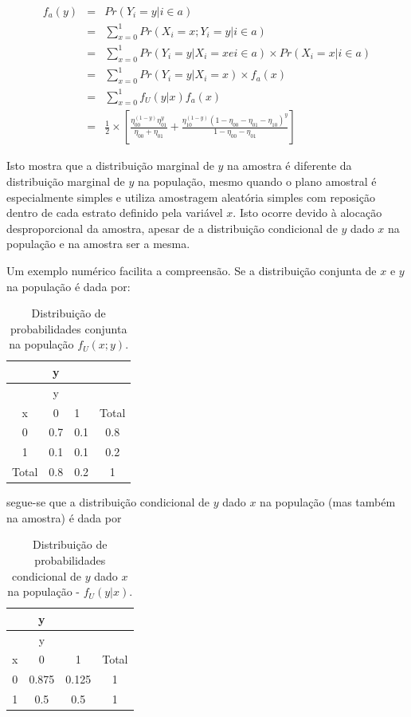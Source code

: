 \documentclass[]{book}
\theoremstyle{definition}
\theoremstyle{definition}
\theoremstyle{definition}
\theoremstyle{remark}
\begin{document}
\begin{eqnarray}
 f_a (y) &= &Pr( Y_i = y | i \in a )\\ 
&=& \sum _{x = 0} ^{1} Pr( X_i = x ; Y_i = y | i \in a) \nonumber \\ 
&=& \sum _{x = 0} ^{1} Pr( Y_i = y | X_i = x e i \in a) \times Pr( X_i = x | i \in a) \nonumber\\ 
&=& \sum _{x = 0} ^{1} Pr( Y_i = y | X_i = x) \times f_a (x) \nonumber \\ 
&=& \sum _{x = 0} ^{1} f_U ( y | x) f_a (x) \nonumber \\ 
&=& \frac{1}{2} \times \left[ \frac{\eta_{00}^{(1-y)} \eta_{01}^y} {\eta_{00}+\eta_{01}}+ \frac{\eta_{10}^{(1-y)} (1 - \eta_{00} - \eta_{01} - \eta_{10})^y} {1 - \eta_{00} - \eta_{01}} \right]\nonumber
\end{eqnarray}

Isto mostra que a distribuição marginal de \(y\) na amostra é diferente
da distribuição marginal de \(y\) na população, mesmo quando o plano
amostral é especialmente simples e utiliza amostragem aleatória simples
com reposição dentro de cada estrato definido pela variável \(x\). Isto
ocorre devido à alocação desproporcional da amostra, apesar de a
distribuição condicional de \(y\) dado \(x\) na população e na amostra
ser a mesma.

Um exemplo numérico facilita a compreensão. Se a distribuição conjunta
de \(x\) e \(y\) na população é dada por:

\begin{longtable}[]{@{}cclc@{}}
\caption{\label{tab:Tab26} Distribuição de probabilidades conjunta na
população \(f_U( x ; y )\).}\tabularnewline
\toprule
& y & &\tabularnewline
\midrule
\endfirsthead
\toprule
& y & &\tabularnewline
\midrule
\endhead
x & 0 & 1 & Total\tabularnewline
0 & 0.7 & 0.1 & 0.8\tabularnewline
1 & 0.1 & 0.1 & 0.2\tabularnewline
Total & 0.8 & 0.2 & 1\tabularnewline
\bottomrule
\end{longtable}

segue-se que a distribuição condicional de \(y\) dado \(x\) na população
(mas também na amostra) é dada por

\begin{longtable}[]{@{}cccc@{}}
\caption{\label{tab:Tab27} Distribuição de probabilidades condicional de
\(y\) dado \(x\) na população - \(f_U( y | x )\).}\tabularnewline
\toprule
& y & &\tabularnewline
\midrule
\endfirsthead
\toprule
& y & &\tabularnewline
\midrule
\endhead
x & 0 & 1 & Total\tabularnewline
0 & 0.875 & 0.125 & 1\tabularnewline
1 & 0.5 & 0.5 & 1\tabularnewline
\bottomrule
\end{longtable}
\end{document}
